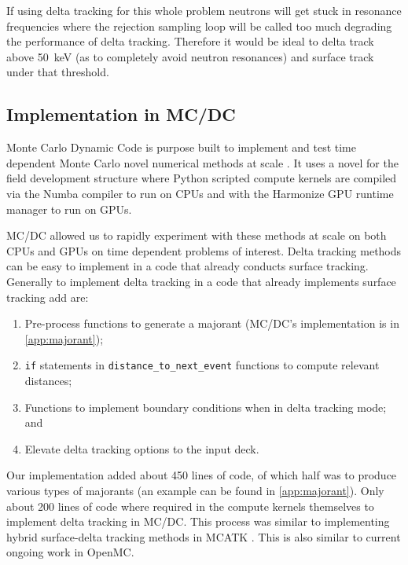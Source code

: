 If using delta tracking for this whole problem neutrons will get stuck in resonance frequencies where the rejection sampling loop will be called too much degrading the performance of delta tracking.
Therefore it would be ideal to delta track above \SI{50}{\kilo\electronvolt} (as to completely avoid neutron resonances) and surface track under that threshold.

\subsection{Implementation in MC/DC}
\label{sec:implementation}

Monte Carlo Dynamic Code is purpose built to implement and test time dependent Monte Carlo novel numerical methods at scale \cite{morgan_2025_monte}.
It uses a novel for the field development structure where Python scripted compute kernels are compiled via the Numba compiler to run on CPUs and with the Harmonize GPU runtime manager to run on GPUs.

MC/DC allowed us to rapidly experiment with these methods at scale on both CPUs and GPUs on time dependent problems of interest.
Delta tracking methods can be easy to implement in a code that already conducts surface tracking. 
Generally to implement delta tracking in a code that already implements surface tracking add are:
\begin{enumerate}
    \item Pre-process functions to generate a majorant (MC/DC's implementation is in \ref{app:majorant});
    \item \texttt{if} statements in \texttt{distance\_to\_next\_event} functions to compute relevant distances;
    \item Functions to implement boundary conditions when in delta tracking mode; and
    \item Elevate delta tracking options to the input deck.
\end{enumerate}
Our implementation added about \num{450} lines of code, of which half was to produce various types of majorants (an example can be found in \ref{app:majorant}). 
Only about \num{200} lines of code where required in the compute kernels themselves to implement delta tracking in MC/DC.
This process was similar to implementing hybrid surface-delta tracking methods in MCATK \cite{morgan2023delta}.
This is also similar to current ongoing work in OpenMC.

